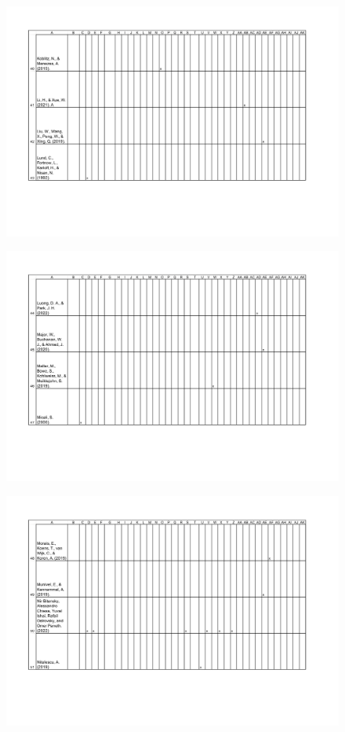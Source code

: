 \begin{figure}[H]
	\centering
		\includegraphics[width=1.0\textwidth]{Pictures/concept_matrix/wos-11.png}
\end{figure}

\begin{figure}[H]
	\centering
		\includegraphics[width=1.0\textwidth]{Pictures/concept_matrix/wos-12.png}
\end{figure}

\begin{figure}[H]
	\centering
		\includegraphics[width=1.0\textwidth]{Pictures/concept_matrix/wos-13.png}
\end{figure}

